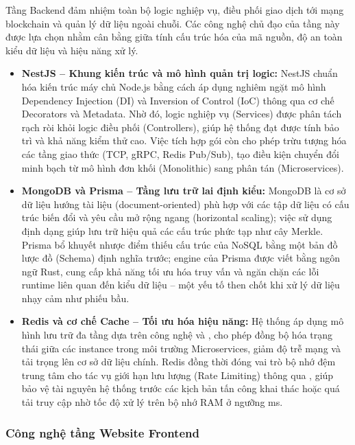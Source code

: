 Tầng Backend đảm nhiệm toàn bộ logic nghiệp vụ, điều phối giao dịch tới mạng blockchain và quản lý dữ liệu ngoài chuỗi. Các công nghệ chủ đạo của tầng này được lựa chọn nhằm cân bằng giữa tính cấu trúc hóa của mã nguồn, độ an toàn kiểu dữ liệu và hiệu năng xử lý.

\begin{itemize}
    \item \textbf{NestJS -- Khung kiến trúc và mô hình quản trị logic:} NestJS chuẩn hóa kiến trúc máy chủ Node.js bằng cách áp dụng nghiêm ngặt mô hình Dependency Injection (DI) và Inversion of Control (IoC) thông qua cơ chế Decorators và Metadata. Nhờ đó, logic nghiệp vụ (Services) được phân tách rạch ròi khỏi logic điều phối (Controllers), giúp hệ thống đạt được tính bảo trì và khả năng kiểm thử cao. Việc tích hợp gói  còn cho phép trừu tượng hóa các tầng giao thức (TCP, gRPC, Redis Pub/Sub), tạo điều kiện chuyển đổi minh bạch từ mô hình đơn khối (Monolithic) sang phân tán (Microservices).

    \item \textbf{MongoDB và Prisma -- Tầng lưu trữ lai định kiểu:} MongoDB là cơ sở dữ liệu hướng tài liệu (document-oriented) phù hợp với các tập dữ liệu có cấu trúc biến đổi và yêu cầu mở rộng ngang (horizontal scaling); việc sử dụng định dạng  giúp lưu trữ hiệu quả các cấu trúc phức tạp như cây Merkle. Prisma bổ khuyết nhược điểm thiếu cấu trúc của NoSQL bằng một bản đồ lược đồ (Schema) định nghĩa trước; engine của Prisma được viết bằng ngôn ngữ Rust, cung cấp khả năng tối ưu hóa truy vấn và ngăn chặn các lỗi runtime liên quan đến kiểu dữ liệu -- một yếu tố then chốt khi xử lý dữ liệu nhạy cảm như phiếu bầu.

    \item \textbf{Redis và cơ chế Cache -- Tối ưu hóa hiệu năng:} Hệ thống áp dụng mô hình lưu trữ đa tầng dựa trên công nghệ  và , cho phép đồng bộ hóa trạng thái giữa các instance trong môi trường Microservices, giảm độ trễ mạng và tải trọng lên cơ sở dữ liệu chính. Redis đồng thời đóng vai trò bộ nhớ đệm trung tâm cho tác vụ giới hạn lưu lượng (Rate Limiting) thông qua , giúp bảo vệ tài nguyên hệ thống trước các kịch bản tấn công khai thác hoặc quá tải truy cập nhờ tốc độ xử lý trên bộ nhớ RAM ở ngưỡng ms.
\end{itemize}

\subsubsection{Công nghệ tầng Website Frontend}

